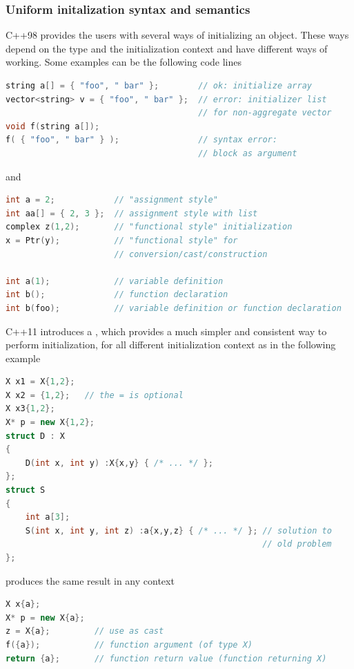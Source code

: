 \subsubsection{Uniform initalization syntax and semantics}
C++98 provides the users with several ways of initializing an object. 
These ways depend on the type and the initialization context and have 
different ways of working.
\newline
Some examples can be the following code lines
\begin{lstlisting}[language=C++]
string a[] = { "foo", " bar" };        // ok: initialize array
vector<string> v = { "foo", " bar" };  // error: initializer list 
                                       // for non-aggregate vector
void f(string a[]);
f( { "foo", " bar" } );                // syntax error: 
                                       // block as argument
\end{lstlisting}
and
\begin{lstlisting}[language=C++]    
int a = 2;            // "assignment style"
int aa[] = { 2, 3 };  // assignment style with list
complex z(1,2);       // "functional style" initialization
x = Ptr(y);           // "functional style" for 
                      // conversion/cast/construction
        
int a(1);             // variable definition
int b();              // function declaration
int b(foo);           // variable definition or function declaration
\end{lstlisting}

C++11 introduces a , 
which provides a much simpler and consistent way to perform initialization, 
for all different initialization context as in the following example
\begin{lstlisting}[language=C++]
X x1 = X{1,2}; 
X x2 = {1,2};   // the = is optional
X x3{1,2}; 
X* p = new X{1,2}; 
struct D : X 
{
    D(int x, int y) :X{x,y} { /* ... */ };
};
struct S
{
    int a[3];
    S(int x, int y, int z) :a{x,y,z} { /* ... */ }; // solution to
                                                    // old problem
};
\end{lstlisting}

 produces the same result in any 
context
\begin{lstlisting}[language=C++]
X x{a}; 
X* p = new X{a};
z = X{a};         // use as cast
f({a});           // function argument (of type X)
return {a};       // function return value (function returning X)
\end{lstlisting}

